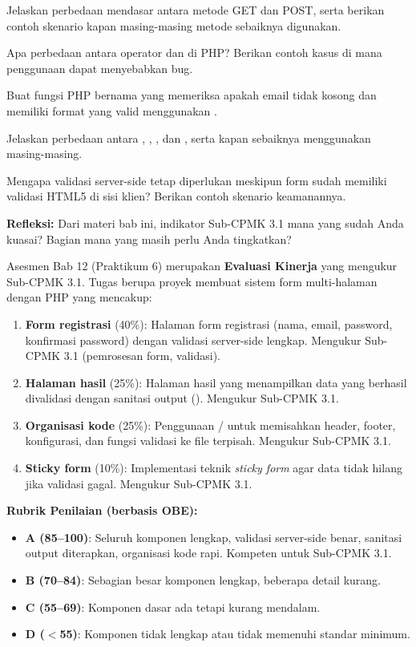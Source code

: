 \documentclass[../main.tex]{subfiles}
\begin{document}
\begin{latihan}
  \item Jelaskan perbedaan mendasar antara metode GET dan POST, serta berikan contoh skenario kapan masing-masing metode sebaiknya digunakan.
  \item Apa perbedaan antara operator \code{==} dan \code{===} di PHP? Berikan contoh kasus di mana penggunaan \code{==} dapat menyebabkan bug.
  \item Buat fungsi PHP bernama  yang memeriksa apakah email tidak kosong dan memiliki format yang valid menggunakan .
  \item Jelaskan perbedaan antara , , , dan , serta kapan sebaiknya menggunakan masing-masing.
  \item Mengapa validasi server-side tetap diperlukan meskipun form sudah memiliki validasi HTML5 di sisi klien? Berikan contoh skenario keamanannya.
  \item \textbf{Refleksi:} Dari materi bab ini, indikator Sub-CPMK 3.1 mana yang sudah Anda kuasai? Bagian mana yang masih perlu Anda tingkatkan?
\end{latihan}

\begin{asesmen}
Asesmen Bab 12 (Praktikum 6) merupakan \textbf{Evaluasi Kinerja} yang mengukur Sub-CPMK 3.1. Tugas berupa proyek membuat sistem form multi-halaman dengan PHP yang mencakup:
\begin{enumerate}
  \item \textbf{Form registrasi} (40\%): Halaman form registrasi (nama, email, password, konfirmasi password) dengan validasi server-side lengkap. Mengukur Sub-CPMK 3.1 (pemrosesan form, validasi).
  \item \textbf{Halaman hasil} (25\%): Halaman hasil yang menampilkan data yang berhasil divalidasi dengan sanitasi output (). Mengukur Sub-CPMK 3.1.
  \item \textbf{Organisasi kode} (25\%): Penggunaan / untuk memisahkan header, footer, konfigurasi, dan fungsi validasi ke file terpisah. Mengukur Sub-CPMK 3.1.
  \item \textbf{Sticky form} (10\%): Implementasi teknik \textit{sticky form} agar data tidak hilang jika validasi gagal. Mengukur Sub-CPMK 3.1.
\end{enumerate}

\textbf{Rubrik Penilaian (berbasis OBE):}
\begin{itemize}
  \item \textbf{A (85--100)}: Seluruh komponen lengkap, validasi server-side benar, sanitasi output diterapkan, organisasi kode rapi. Kompeten untuk Sub-CPMK 3.1.
  \item \textbf{B (70--84)}: Sebagian besar komponen lengkap, beberapa detail kurang.
  \item \textbf{C (55--69)}: Komponen dasar ada tetapi kurang mendalam.
  \item \textbf{D ($<$55)}: Komponen tidak lengkap atau tidak memenuhi standar minimum.
\end{itemize}
\end{asesmen}
\end{document}
